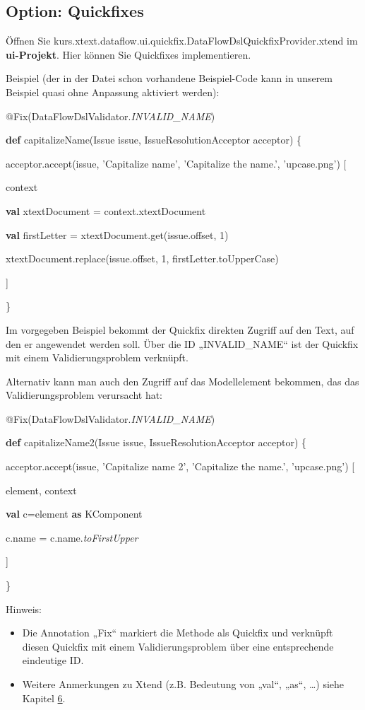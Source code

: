 \documentclass[a4]{article}
\providecommand{\tightlist}{%
  \setlength{\itemsep}{0pt}\setlength{\parskip}{0pt}}
\begin{document}
\subsection[Option:
Quickfixes]{\texorpdfstring{\protect\hypertarget{anchor-32}{}{}Option:
Quickfixes}{Option: Quickfixes}}\label{option-quickfixes}

Öffnen Sie
kurs.xtext.dataflow.ui.quickfix.DataFlowDslQuickfixProvider.xtend im
\textbf{ui-Projekt}. Hier können Sie Quickfixes implementieren.

Beispiel (der in der Datei schon vorhandene Beispiel-Code kann in
unserem Beispiel quasi ohne Anpassung aktiviert werden):

@Fix(DataFlowDslValidator.\emph{INVALID\_NAME})

\textbf{def} capitalizeName(Issue issue, IssueResolutionAcceptor
acceptor) \{

acceptor.accept(issue, 'Capitalize name', 'Capitalize the name.',
'upcase.png') {[}

context \textbar{}

\textbf{val} xtextDocument = context.xtextDocument

\textbf{val} firstLetter = xtextDocument.get(issue.offset, 1)

xtextDocument.replace(issue.offset, 1, firstLetter.toUpperCase)

{]}

\}

Im vorgegeben Beispiel bekommt der Quickfix direkten Zugriff auf den
Text, auf den er angewendet werden soll. Über die ID „INVALID\_NAME``
ist der Quickfix mit einem Validierungsproblem verknüpft.

Alternativ kann man auch den Zugriff auf das Modellelement bekommen, das
das Validierungsproblem verursacht hat:

@Fix(DataFlowDslValidator.\emph{INVALID\_NAME})

\textbf{def} capitalizeName2(Issue issue, IssueResolutionAcceptor
acceptor) \{

acceptor.accept(issue, 'Capitalize name 2', 'Capitalize the name.',
'upcase.png') {[}

element, context \textbar{}

\textbf{val} c=element \textbf{as} KComponent

c.name = c.name.\emph{toFirstUpper}

{]}

\}

Hinweis:

\begin{itemize}
\tightlist
\item
  Die Annotation „Fix`` markiert die Methode als Quickfix und verknüpft
  diesen Quickfix mit einem Validierungsproblem über eine entsprechende
  eindeutige ID.
\item
  Weitere Anmerkungen zu Xtend (z.B. Bedeutung von „val``, „as``,
  \ldots{}) siehe Kapitel \protect\hyperlink{anchor-33}{6}.
\end{itemize}
\end{document}
